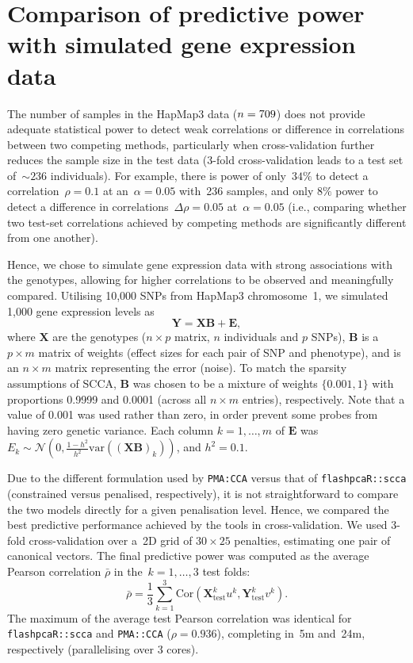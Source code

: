 \documentclass[a4paper,10pt]{article}
\begin{document}
\section{Comparison of predictive power with simulated gene expression data}
\label{section:sim}

The number of samples in the HapMap3 data ($n=709$) does not provide
adequate statistical power to detect weak correlations or difference in
correlations between two competing methods, particularly when cross-validation
further reduces the sample size in the test data (3-fold cross-validation
leads to a test set of~${\sim}236$ individuals). For example, there is power
of only~$34\%$ to detect a correlation~$\rho=0.1$ at an~$\alpha=0.05$
with~236 samples, and only $8\%$ power to detect a difference in
correlations~$\Delta\rho=0.05$ at~$\alpha=0.05$ (i.e., comparing whether
two test-set correlations achieved by competing methods are significantly
different from one another).


Hence, we chose to simulate gene expression data with strong associations
with the genotypes, allowing for higher correlations to be observed and
meaningfully compared.  Utilising 10,000 SNPs from HapMap3 chromosome~1,
we simulated 1,000 gene expression levels as
$$
\mathbf{Y} = \mathbf{X} \mathbf{B} + \mathbf{E},
$$
where $\mathbf{X}$ are the genotypes ($n \times p$ matrix, $n$ individuals and
$p$ SNPs), $\mathbf{B}$ is a $p \times m$ matrix of weights (effect sizes for
each pair of SNP and phenotype), and is an $n \times m$ matrix representing
the error (noise). To match the sparsity assumptions of SCCA, $\mathbf{B}$
was chosen to be a mixture of weights $\{0.001, 1\}$ with proportions 0.9999
and 0.0001 (across all $n \times m$ entries), respectively.  Note that a value
of 0.001 was used rather than zero, in order prevent some probes from having
zero genetic variance. Each column $k=1,\hdots,m$ of $\mathbf{E}$ was $E_k
\sim \mathcal{N}(0, \frac{1-h^2}{h^2} \mbox{var}((\mathbf{X}\mathbf{B})_k))$,
and $h^2=0.1$.

Due to the different formulation used by \texttt{PMA:CCA} versus that of
\texttt{flashpcaR::scca} (constrained versus penalised, respectively),
it is not straightforward to compare the two models directly for a given
penalisation level. Hence, we compared the best predictive performance
achieved by the tools in cross-validation.  We used 3-fold cross-validation
over a~2D grid of $30\times25$ penalties, estimating one pair of canonical
vectors. The final predictive power was computed as the average Pearson
correlation $\bar{\rho}$ in the~$k=1,\hdots,3$ test folds:
$$
\bar{\rho} = \frac{1}{3} \sum_{k=1}^3
   \mbox{Cor}(\mathbf{X}_{\mbox{test}}^k u^k, \mathbf{Y}_{\mbox{test}}^k v^k).
$$
The maximum of the average test Pearson correlation was identical for
\texttt{flashpcaR::scca} and \texttt{PMA::CCA} ($\rho{=}0.936$), completing
in~5m and~24m, respectively (parallelising over 3 cores).
\end{document}

